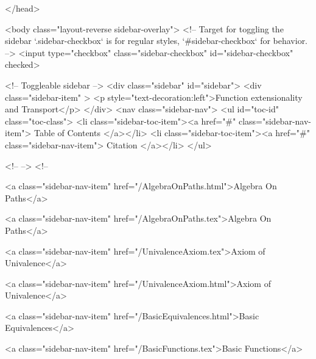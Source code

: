   
</head>




  <body class="layout-reverse sidebar-overlay">
    <!-- Target for toggling the sidebar `.sidebar-checkbox` is for regular
     styles, `#sidebar-checkbox` for behavior. -->
<input type="checkbox" class="sidebar-checkbox" id="sidebar-checkbox" checked>

<!-- Toggleable sidebar -->
<div class="sidebar" id="sidebar">
  <div class="sidebar-item" >
    <p style="text-decoration:left">Function extensionality and Transport</p>
  </div>
  <nav class="sidebar-nav">
    <ul id="toc-id" class="toc-class">
  <li class="sidebar-toc-item"><a href="#" class="sidebar-nav-item"> Table of Contents </a></li>
  <li class="sidebar-toc-item"><a href="#" class="sidebar-nav-item"> Citation </a></li>
</ul>


    <!--  -->
    <!-- 
      
    
      
    
      
    
      
    
      
        
      
    
      
        
          <a class="sidebar-nav-item" href="/AlgebraOnPaths.html">Algebra On Paths</a>
        
      
    
      
        
          <a class="sidebar-nav-item" href="/AlgebraOnPaths.tex">Algebra On Paths</a>
        
      
    
      
        
          <a class="sidebar-nav-item" href="/UnivalenceAxiom.tex">Axiom of Univalence</a>
        
      
    
      
        
          <a class="sidebar-nav-item" href="/UnivalenceAxiom.html">Axiom of Univalence</a>
        
      
    
      
        
          <a class="sidebar-nav-item" href="/BasicEquivalences.html">Basic Equivalences</a>
        
      
    
      
        
          <a class="sidebar-nav-item" href="/BasicFunctions.tex">Basic Functions</a>
        

